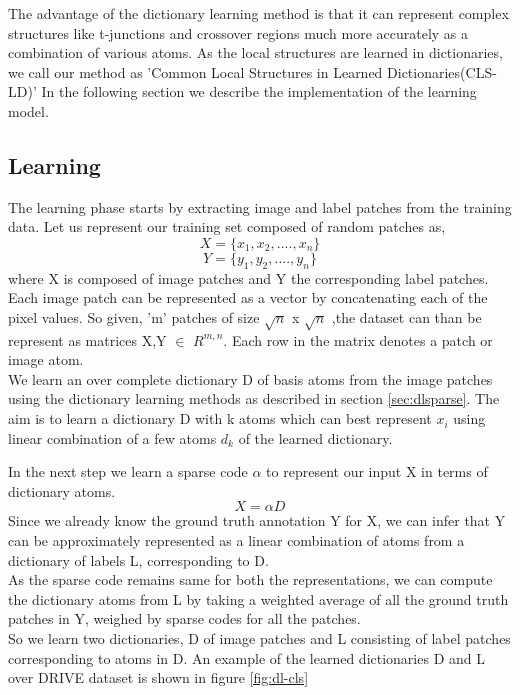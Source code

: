 The advantage of the dictionary learning method is that it can represent complex structures like t-junctions and crossover regions much more accurately as a combination of various atoms.
As the local structures are learned in dictionaries, we call our method as 'Common Local Structures in Learned Dictionaries(CLS-LD)'
In the following section we describe the implementation of the learning model.

\subsection{Learning}
The learning phase starts by extracting image and label patches from the training data. Let us represent our training set composed of random patches as,
$$
X = \{x_1,x_2,....,x_n\}
$$
$$
Y = \{y_1,y_2,....,y_n\}
$$
where X is composed of image patches and Y the corresponding label patches. Each image patch can be represented as a vector by concatenating each of the pixel values. So given, 'm' patches of size $\sqrt{n}$ x $\sqrt{n}$ ,the dataset can than be represent as matrices 
X,Y $\in$ $R^{m,n}$. Each row in the matrix denotes a patch or image atom.\\

We learn an over complete dictionary D of basis atoms from the image patches using the dictionary learning methods as described in section \ref{sec:dlsparse}. The aim is to learn a dictionary D with k atoms which can best represent $x_i$ using linear combination of a few atoms $d_k$ of the learned dictionary.

In the next step we learn a sparse code $\alpha$ to represent our input X in terms of dictionary atoms.
$$
X = \alpha D
$$ 
Since we already know the ground truth annotation Y for X, we can infer that Y can be approximately represented as a linear combination of atoms from a dictionary of labels L, corresponding to D.\\

As the sparse code remains same for both the representations, we can compute the dictionary atoms from L by taking a weighted average of all the ground truth patches in Y, weighed by sparse codes for all the patches.\\

So we learn two dictionaries, D of image patches and L consisting of label patches corresponding to atoms in D. An example of the learned dictionaries D and L over DRIVE dataset is shown in figure \ref{fig:dl-cls}


